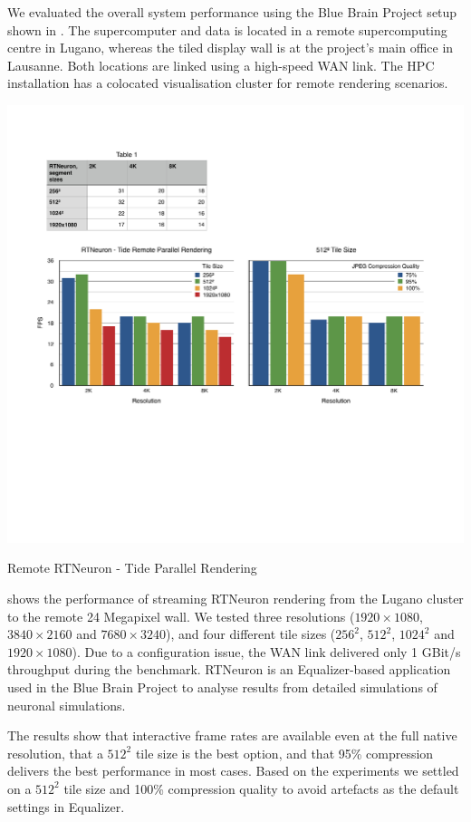 We evaluated the overall system performance using the Blue Brain Project setup
shown in . The supercomputer and data is located in a remote
supercomputing centre in Lugano, whereas the tiled display wall is at the
project's main office in Lausanne. Both locations are linked using a high-speed
WAN link. The HPC installation has a colocated visualisation cluster for remote
rendering scenarios.

\begin{benchmark}[h!t]\center
  \includegraphics[width=\columnwidth]{results/tide}
  \caption{\label{rTide}Remote RTNeuron - Tide Parallel Rendering}
\end{benchmark}

 shows the performance of streaming RTNeuron rendering from the
Lugano cluster to the remote 24 Megapixel wall. We tested three resolutions
($1920\times 1080$, $3840\times 2160$ and $7680\times 3240$), and four
different tile sizes ($256^2$, $512^2$, $1024^2$ and $1920\times 1080$). Due to
a configuration issue, the WAN link delivered only 1 GBit/s throughput during
the benchmark. RTNeuron is an Equalizer-based application used in the Blue
Brain Project to analyse results from detailed simulations of neuronal
simulations.

The results show that interactive frame rates are available even at the full
native resolution, that a $512^2$ tile size is the best option, and that 95\%
compression delivers the best performance in most cases. Based on the
experiments we settled on a $512^2$ tile size and 100\% compression quality to
avoid artefacts as the default settings in Equalizer.

